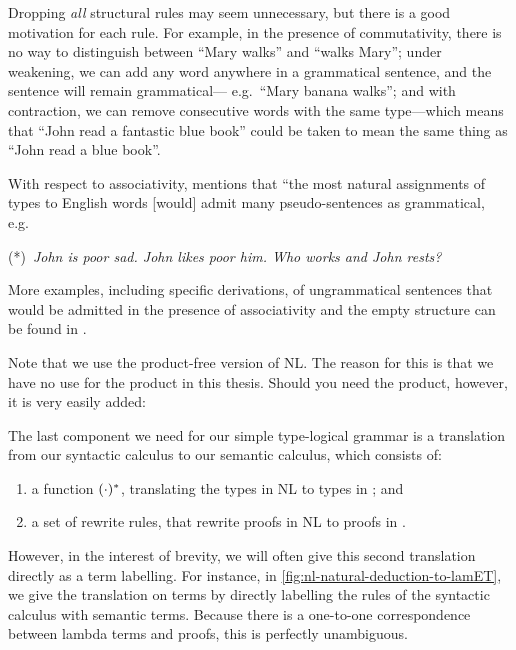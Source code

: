 

Dropping \emph{all} structural rules may seem unnecessary, but there
is a good motivation for each rule.  For example, in the presence of
commutativity, there is no way to distinguish between ``Mary walks''
and ``walks Mary''; under weakening, we can add any word anywhere in a
grammatical sentence, and the sentence will remain grammatical---
e.g.\ ``Mary banana walks''; and with contraction, we can remove
consecutive words with the same type---which means that ``John read
a fantastic blue book'' could be taken to mean the same thing as
``John read a blue book''.

With respect to associativity, \citet[][p.\ 167]{lambek1961} mentions
that ``the most natural assignments of types to English words [would]
admit many pseudo-sentences as grammatical, e.g.\ %
\begin{center}
  (*)~\itshape John is poor sad. John likes poor him. Who works and
  John rests?
\end{center}
More examples, including specific derivations, of ungrammatical
sentences that would be admitted in the presence of associativity and
the empty structure can be found in \citet[p.\ 33, 105-106]{moot2012}.

Note that we use the product-free version of NL. The reason for this
is that we have no use for the product in this thesis. Should you need
the product, however, it is very easily added:
\begin{center}
  \begin{pfbox}
  \end{pfbox}
  \begin{pfbox}
  \end{pfbox}
\end{center}

The last component we need for our simple type-logical grammar is a
translation from our syntactic calculus to our semantic calculus,
which consists of:
\begin{enumerate}[label=(\arabic*)]
\item
  a function $({\cdot})^*$, translating the types in NL to types in \lamET; and
\item
  a set of rewrite rules, that rewrite proofs in NL to proofs in \lamET.
\end{enumerate}
However, in the interest of brevity, we will often give this second
translation directly as a term labelling. For instance, in
\autoref{fig:nl-natural-deduction-to-lamET}, we give the
translation on terms by directly labelling the rules of the syntactic
calculus with semantic terms. Because there is a one-to-one
correspondence between lambda terms and proofs, this is perfectly
unambiguous.

